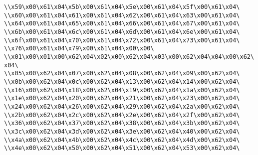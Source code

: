 \verb|\\x59\x00\x61\x04\x5b\x00\x61\x04\x5e\x00\x61\x04\x5f\x00\x61\x04\|\newline
\verb|\\x60\x00\x61\x04\x61\x00\x61\x04\x62\x00\x61\x04\x63\x00\x61\x04\|\newline
\verb|\\x64\x00\x61\x04\x65\x00\x61\x04\x66\x00\x61\x04\x67\x00\x61\x04\|\newline
\verb|\\x6b\x00\x61\x04\x6c\x00\x61\x04\x6d\x00\x61\x04\x6e\x00\x61\x04\|\newline
\verb|\\x6f\x00\x61\x04\x70\x00\x61\x04\x72\x00\x61\x04\x73\x00\x61\x04\|\newline
\verb|\\x76\x00\x61\x04\x79\x00\x61\x04\x00\x00\|\newline
\verb|\\x01\x00\x01\x00\x62\x04\x02\x00\x62\x04\x03\x00\x62\x04\x04\x00\x62\x04\|\newline
\verb|\\x05\x00\x62\x04\x07\x00\x62\x04\x08\x00\x62\x04\x09\x00\x62\x04\|\newline
\verb|\\x0b\x00\x62\x04\x0c\x00\x62\x04\x13\x00\x62\x04\x14\x00\x62\x04\|\newline
\verb|\\x16\x00\x62\x04\x18\x00\x62\x04\x19\x00\x62\x04\x1a\x00\x62\x04\|\newline
\verb|\\x1e\x00\x62\x04\x20\x00\x62\x04\x21\x00\x62\x04\x23\x00\x62\x04\|\newline
\verb|\\x24\x00\x62\x04\x26\x00\x62\x04\x29\x00\x62\x04\x2a\x00\x62\x04\|\newline
\verb|\\x2b\x00\x62\x04\x2c\x00\x62\x04\x2e\x00\x62\x04\x2f\x00\x62\x04\|\newline
\verb|\\x36\x00\x62\x04\x37\x00\x62\x04\x38\x00\x62\x04\x3b\x00\x62\x04\|\newline
\verb|\\x3c\x00\x62\x04\x3d\x00\x62\x04\x3e\x00\x62\x04\x40\x00\x62\x04\|\newline
\verb|\\x4a\x00\x62\x04\x4b\x00\x62\x04\x4c\x00\x62\x04\x4d\x00\x62\x04\|\newline
\verb|\\x4e\x00\x62\x04\x50\x00\x62\x04\x51\x00\x62\x04\x53\x00\x62\x04\|\newline
